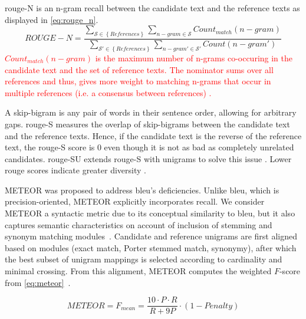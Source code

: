 \ac{rouge}-N is an n-gram recall between the candidate text and the reference texts \citep{lin_rouge_2004} as displayed in \autoref{eq:rouge_n}.
\begin{equation}
    ROUGE-N = \frac{\sum_{\mathcal{S} \in \left\{ References \right\}}\sum_{n-gram \in\mathcal{S}}Count_{match}(n-gram)}{\sum_{\mathcal{S'} \in \left\{ References \right\}}\sum_{n-gram' \in\mathcal{S'}}Count(n-gram')}
\label{eq:rouge_n}
\end{equation}
\textcolor{red}{$Count_{match}(n-gram)$ is the maximum number of n-grams co-occuring in the candidate text and the set of reference texts.
The nominator sums over all references and thus, gives more weight to matching n-grams that occur in multiple references (i.e. a consensus between references) \citep{lin_rouge_2004}.}

A skip-bigram is any pair of words in their sentence order, allowing for arbitrary gaps.
\ac{rouge}-S measures the overlap of skip-bigrams between the candidate text and the reference texts.
Hence, if the candidate text is the reverse of the reference text, the \ac{rouge}-S score is 0 even though it is not as bad as completely unrelated candidates.
\ac{rouge}-SU extends \ac{rouge}-S with unigrams to solve this issue \citep{lin_rouge_2004}.
Lower \ac{rouge} scores indicate greater diversity \citep{kurt_pehlivanoglu_comparative_2024}.

METEOR was proposed to address \ac{bleu}'s deficiencies. 
Unlike \ac{bleu}, which is precision-oriented, METEOR explicitly incorporates recall.
We consider METEOR a syntactic metric due to its conceptual similarity to \ac{bleu}, but it also captures semantic characteristics on account of inclusion of stemming and synonym matching modules~\citep{kurt_pehlivanoglu_comparative_2024}. 
Candidate and reference unigrams are first aligned based on modules (exact match, Porter stemmed match, synonymy), after which the best subset of unigram mappings is selected according to cardinality and minimal crossing. 
From this alignment, METEOR computes the weighted $F$-score from \autoref{eq:meteor}~\citep{banerjee_METEOR_2005}.

\begin{equation}
    METEOR = F_{mean} = \frac{10 \cdot P \cdot R}{R + 9P} \cdot (1 - Penalty)
\label{eq:meteor}
\end{equation}

